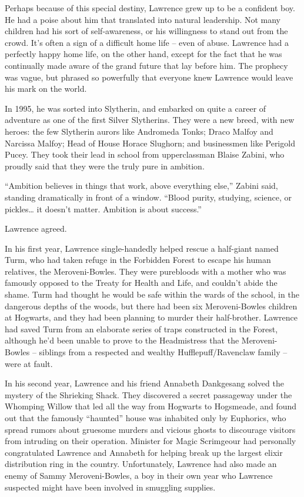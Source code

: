 Perhaps because of this special destiny, Lawrence grew up to be a
confident boy. He had a poise about him that translated into natural
leadership. Not many children had his sort of self-awareness, or his
willingness to stand out from the crowd. It's often a sign of a
difficult home life -- even of abuse. Lawrence had a perfectly happy
home life, on the other hand, except for the fact that he was
continually made aware of the grand future that lay before him. The
prophecy was vague, but phrased so powerfully that everyone knew
Lawrence would leave his mark on the world.

In 1995, he was sorted into Slytherin, and embarked on quite a career of
adventure as one of the first Silver Slytherins. They were a new breed,
with new heroes: the few Slytherin aurors like Andromeda Tonks; Draco
Malfoy and Narcissa Malfoy; Head of House Horace Slughorn; and
businessmen like Perigold Pucey. They took their lead in school from
upperclassman Blaise Zabini, who proudly said that they were the truly
pure in ambition.

``Ambition believes in things that work, above everything else,'' Zabini
said, standing dramatically in front of a window. ``Blood purity,
studying, science, or pickles\ldots{} it doesn't matter. Ambition is
about success.''

Lawrence agreed.

In his first year, Lawrence single-handedly helped rescue a half-giant
named Turm, who had taken refuge in the Forbidden Forest to escape his
human relatives, the Meroveni-Bowles. They were purebloods with a mother
who was famously opposed to the Treaty for Health and Life, and couldn't
abide the shame. Turm had thought he would be safe within the wards of
the school, in the dangerous depths of the woods, but there had been six
Meroveni-Bowles children at Hogwarts, and they had been planning to
murder their half-brother. Lawrence had saved Turm from an elaborate
series of traps constructed in the Forest, although he'd been unable to
prove to the Headmistress that the Meroveni-Bowles -- siblings from a
respected and wealthy Hufflepuff/Ravenclaw family -- were at fault.

In his second year, Lawrence and his friend Annabeth Dankgesang solved
the mystery of the Shrieking Shack. They discovered a secret passageway
under the Whomping Willow that led all the way from Hogwarts to
Hogsmeade, and found out that the famously ``haunted'' house was
inhabited only by Euphorics, who spread rumors about gruesome murders
and vicious ghosts to discourage visitors from intruding on their
operation. Minister for Magic Scrimgeour had personally congratulated
Lawrence and Annabeth for helping break up the largest elixir
distribution ring in the country. Unfortunately, Lawrence had also made
an enemy of Sammy Meroveni-Bowles, a boy in their own year who Lawrence
suspected might have been involved in smuggling supplies.


